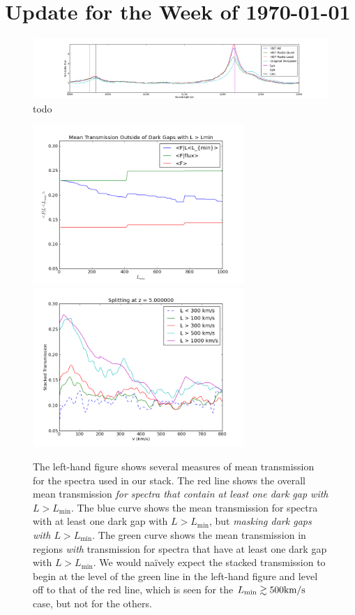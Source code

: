 \documentclass[11pt]{article}
\begin{document}
\section*{Update for the Week of \today}

\begin{figure}[h]
  \centering
  \includegraphics[width=18cm]{CompareTemplates.png}
  \caption{todo}
  \label{fig:todo}
\end{figure}


\begin{figure}[h]
  \centering
  \includegraphics[width=8cm]{flux_ExcludeLs.png}
  \includegraphics[width=8cm]{Stack_Zgreaterthan5.png}
  \caption{The left-hand figure shows several measures of mean transmission for the spectra used in our stack. The red line shows the overall mean transmission \textit{for spectra that contain at least one dark gap with $L > L_{\text{min}}$}. The blue curve shows the mean transmission for spectra with at least one dark gap with $L > L_{\text{min}}$, but \textit{masking dark gaps with $L > L_{\text{min}}$}. The green curve shows the mean transmission in regions \textit{with} transmission for spectra that have at least one dark gap with $L > L_{\text{min}}$. We would na\"ively expect the stacked transmission to begin at the level of the green line in the left-hand figure and level off to that of the red line, which is seen for the $L_{\text{min}} \gtrsim 500\text{km}/\text{s}$ case, but not for the others.}
  \label{fig:todo}
\end{figure}
\end{document}
